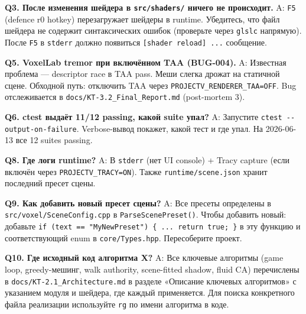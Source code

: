 \documentclass[
  11pt,a4paper,oneside]{article}
\begin{document}
\textbf{Q3. После изменения шейдера в \texttt{src/shaders/} ничего не происходит.}
A: \texttt{F5} (defence r0 hotkey) перезагружает шейдеры в runtime. Убедитесь, что файл шейдера не содержит синтаксических ошибок (проверьте через \texttt{glslc} напрямую). После \texttt{F5} в \texttt{stderr} должно появиться \texttt{{[}shader\ reload{]}\ ...} сообщение.

\textbf{Q5. VoxelLab tremor при включённом TAA (BUG-004).}
A: Известная проблема --- descriptor race в TAA pass. Меши слегка дрожат на статичной сцене. Обходной путь: отключить TAA через \texttt{PROJECTV\_RENDERER\_TAA=OFF}. Bug отслеживается в \texttt{docs/KT-3.2\_Final\_Report.md} (post-mortem 3).

\textbf{Q6. ctest выдаёт 11/12 passing, какой suite упал?}
A: Запустите \texttt{ctest\ -\/-output-on-failure}. Verbose-вывод покажет, какой тест и где упал. На 2026-06-13 все 12 suites passing.

\textbf{Q8. Где логи runtime?}
A: В \texttt{stderr} (нет UI console) + Tracy capture (если включён через \texttt{PROJECTV\_TRACY=ON}). Также \texttt{runtime/scene.json} хранит последний пресет сцены.

\textbf{Q9. Как добавить новый пресет сцены?}
A: Все пресеты определены в \texttt{src/voxel/SceneConfig.cpp} в \texttt{ParseScenePreset()}. Чтобы добавить новый: добавьте \texttt{if\ (text\ ==\ "MyNewPreset")\ \{\ ...\ return\ true;\ \}} в эту функцию и соответствующий enum в \texttt{core/Types.hpp}. Пересоберите проект.

\textbf{Q10. Где исходный код алгоритма X?}
A: Все ключевые алгоритмы (game loop, greedy-мешинг, walk authority, scene-fitted shadow, fluid CA) перечислены в \texttt{docs/KT-2.1\_Architecture.md} в разделе «Описание ключевых алгоритмов» с указанием модуля и шейдера, где каждый применяется. Для поиска конкретного файла реализации используйте \texttt{rg} по имени алгоритма в коде.
\end{document}
